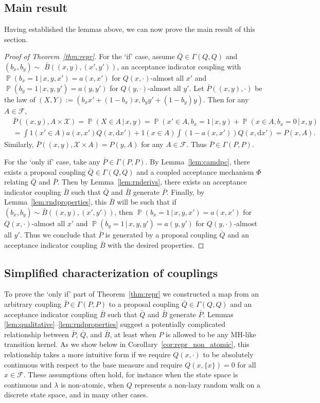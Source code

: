 \documentclass[aihp]{imsart}
\theoremstyle{plain}
\theoremstyle{remark}
\theoremstyle{definition} \newtheorem{example}{Example}
\newcommand{\eq}[1]{\begin{align*}#1\end{align*}} %
\renewcommand{\P}{\operatorname{\mathbb{P}}}
\newcommand{\scrF}{\mathscr{F}}
\newcommand{\calX}{\mathcal{X}}
\newcommand{\g}{\, | \,}
\newcommand{\diff}{\mathrm{d} } %
\newcommand{\bp}{\bar P}
\newcommand{\bq}{\bar Q}
\newcommand{\bb}{\bar B}
\newcommand{\sx}{\{ x \}}
\newcommand{\xy}{(x,y)}
\newcommand{\xyp}{(x',y')}
\newcommand{\bxy}{(b_x,b_y)}
\begin{document}
\subsection{Main result}

Having established the lemmas above, we can now prove the main result of this section.

\begin{proof}[Proof of Theorem~\ref{thm:repr}]
For the `if' case, assume $\bq \in \Gamma(Q,Q)$ and $\bxy \sim$ $\bb(\xy,\xyp)$, an acceptance
indicator coupling with $\P(b_x=1 \g x,y,x') = a(x,x')$ for $Q(x,\cdot)$-almost all $x'$ and
$\P(b_y=1 \g x,y,y')= a(y,y')$ for $Q(y,\cdot)$-almost all $y'$. Let $\bp(\xy, \cdot)$ be the law of
$(X,Y) := (b_x x' + (1-b_x) x, b_y y' + (1 - b_y) y).$ Then for any $A \in \scrF$,
\eq{
	& \bp(\xy, A \times \calX)
	= \P(X \in A \g x,y) = \P(x' \in A, b_x=1 \g x,y) + \P(x \in A, b_x=0 \g x,y) \\
	& = \int 1(x' \in A) a(x,x') Q(x, \diff x') + 1(x \in A) \int (1-a(x,x')) Q(x, \diff x')
	= P(x, A).
}
Similarly, $\bp(\xy, \calX \times A) = P(y, A)$ for any $A \in \scrF$. Thus $\bp
\in \Gamma(P,P)$.

For the `only if' case, take any $\bp \in \Gamma(P,P)$. By Lemma~\ref{lem:camdpc}, there exists a
proposal coupling $\bq \in \Gamma(Q,Q)$ and a coupled acceptance mechanism $\Phi$ relating $\bq$ and
$\bp$. Then by Lemma~\ref{lem:rnderivs}, there exists an acceptance indicator coupling $\bb$ such
that $\bq$ and $\bb$ generate $\bp$. Finally, by Lemma~\ref{lem:rndproperties}, this $\bb$ will be
such that if $\bxy \sim \bb(\xy,\xyp)$, then $\P(b_x=1 \g x,y,x') = a(x,x')$ for $Q(x,\cdot)$-almost
all $x'$ and $\P(b_y=1 \g x,y,y')= a(y,y')$ for $Q(y,\cdot)$-almost all $y'$. Thus we conclude that
$\bp$ is generated by a proposal coupling $\bq$ and an acceptance indicator coupling $\bb$ with the
desired properties.
\end{proof}


\subsection{Simplified characterization of couplings}
\label{sec:cor}

To prove the `only if' part of Theorem~\ref{thm:repr} we constructed a map from an arbitrary
coupling $\bp \in \Gamma(P,P)$ to a proposal coupling $\bq \in \Gamma(Q,Q)$ and an acceptance
indicator coupling $\bb$ such that $\bq$ and $\bb$ generate $\bp$.  Lemmas
\ref{lem:qualitative}--\ref{lem:rndproperties} suggest a potentially complicated relationship
between $\bp$, $\bq$, and $\bb$, at least when $P$ is allowed to be any MH-like transition kernel.
As we show below in Corollary~\ref{cor:repr_non_atomic}, this relationship takes a more intuitive
form if we require $Q(x, \cdot)$ to be absolutely continuous with respect to the base measure and
require $Q(x, \sx) = 0$ for all $x \in \scrF$. These assumptions often hold, for instance when the state space
is continuous and $\lambda$ is non-atomic, when $Q$ represents a non-lazy random walk on a discrete
state space, and in many other cases.
\end{document}
